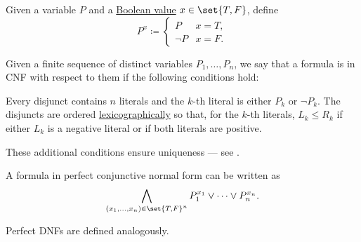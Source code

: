 \begin{definition}
\begin{thmenum}
     Given a variable \( P \) and a \hyperref[def:boolean_value]{Boolean value} \( x \in \set{ T, F } \), define
    \begin{equation*}
      P^x \coloneqq \begin{cases}
        P      &x = T, \\
        \neg P &x = F.
      \end{cases}
    \end{equation*}

     Given a finite sequence of distinct variables \( P_1, \ldots, P_n \), we say that a formula is in  CNF with respect to them if the following conditions hold:
    \begin{thmenum}
       Every disjunct contains \( n \) literals and the \( k \)-th literal is either \( P_k \) or \( \neg P_k \).
       The disjuncts are ordered \hyperref[def:lexicographic_order]{lexicographically} so that, for the \( k \)-th literals, \( L_k \leq R_k \) if either \( L_k \) is a negative literal or if both literals are positive.
    \end{thmenum}

    These additional conditions ensure uniqueness --- see .

    A formula in perfect conjunctive normal form can be written as
    \begin{equation*}
      \bigwedge_{(x_1, \ldots, x_n) \in \set{ T, F }^n} P_1^{x_1} \vee \cdots \vee P_n^{x_n}.
    \end{equation*}

    Perfect DNFs are defined analogously.
  \end{thmenum}
\end{definition}

